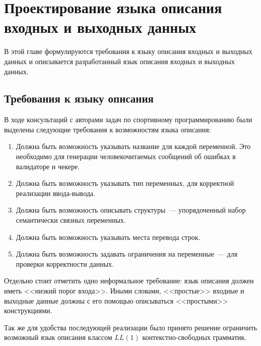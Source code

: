 \documentclass[times,specification,annotation]{style/itmo-student-thesis/itmo-student-thesis}
\begin{document}


\chapter{Проектирование языка описания входных и выходных данных}

В этой главе формулируются требования к языку описания входных и выходных данных и описывается разработанный язык описания входных и выходных данных.

\section{Требования к языку описания}

В ходе консультаций с авторами задач по спортивному программированию были выделены следующие требования к возможностям языка описания:

\begin{enumerate}
    \item Должна быть возможность указывать название для каждой переменной. Это необходимо для генерации человекочитаемых сообщений об ошибках в валидаторе и чекере.
    \item Должна быть возможность указывать тип переменных, для корректной реализации ввода-вывода.
    \item Должна быть возможность описывать структуры~--- упорядоченный набор семантически связных переменных.
    \item Должна быть возможность указывать места перевода строк.
    \item Должна быть возможность задавать ограничения на переменные~--- для проверки корректности данных.
\end{enumerate}

Отдельно стоит отметить одно неформальное требование: язык описания должен иметь <<низкий порог входа>>. Иными словами, <<простые>> входные и выходные данные должны с его помощью описываться <<простыми>> конструкциями.

Так же для удобства последующей реализации было принято решение ограничить возможный язык описания классом $LL(1)$ контекстно-свободных грамматик.
\end{document}
